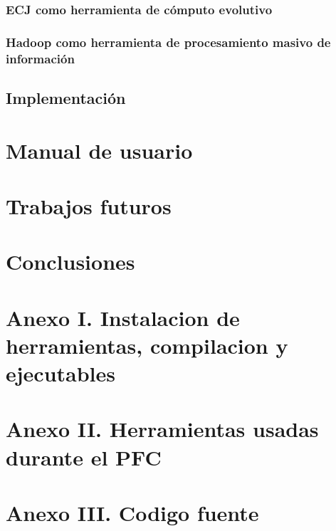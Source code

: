 \documentclass{memoriaPFC}
\begin{document}
		\subsection{ECJ como herramienta de c\'omputo evolutivo}
		\subsection{Hadoop como herramienta de procesamiento masivo de informaci\'on}
	\section{Implementaci\'on}

\chapter{Manual de usuario}

\chapter{Trabajos futuros}

\chapter{Conclusiones}

\chapter{Anexo I. Instalacion de herramientas, compilacion y ejecutables}

\chapter{Anexo II. Herramientas usadas durante el PFC}

\chapter{Anexo III. Codigo fuente}

\end{document}
